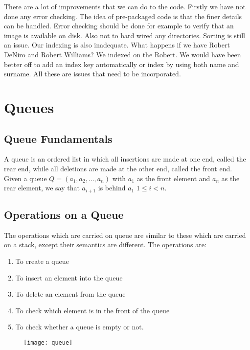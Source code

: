 There are a lot of improvements that we can do to the code. Firstly we have not done any error checking. The idea of pre-packaged code is that the finer details can be handled. Error checking should be done for example to verify that an image is available on disk. Also not to hard wired any directories. Sorting is still an issue. Our indexing is also inadequate. What happens if we have Robert DeNiro and Robert Williams? We indexed on the Robert. We would have been better off to add an index key automatically or index by using both name and surname. All these are issues that need to be incorporated. 



\chapter{Queues}
\section{Queue Fundamentals}

A queue is an ordered list in which all insertions are made at one end, called the rear end, while all deletions are made at the other end, called the front end. Given a queue $Q=(a_1,a_2,\dots,a_n)$ with $a_1$ as the front element and $a_n$ as the rear element, we say that $a_{i+1}$ is behind $a_1$ $1 \leq i <n$.

\section{Operations on a Queue}

The operations which are carried on queue are similar to these which are carried on a stack, except their semantics are different. The operations are:

\begin{enumerate}
\item To create a queue
\item To insert an element into the queue
\item To delete an element from the queue
\item To check which element is in the front of  the queue
\item To check whether a queue is empty or not.
\end{enumerate}

\begin{figure}[htbp]
\centering
\texttt{[image: queue]}
\end{figure}

